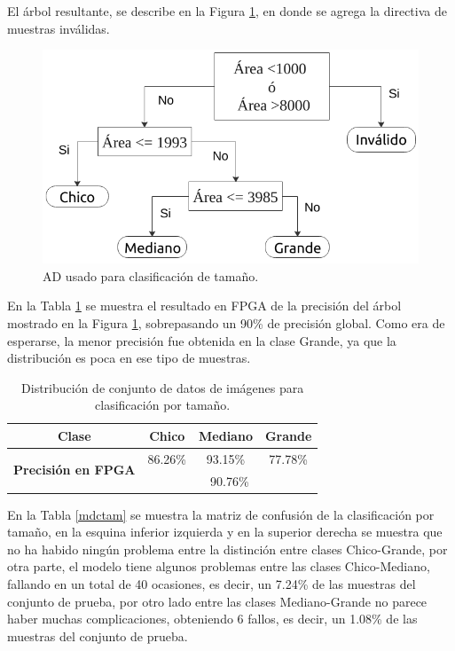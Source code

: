\documentclass[twoside,spanish,ESP,MSc]{plantillaLabUPV}
\theoremstyle{definition}
\begin{document}
El árbol resultante, se describe en la Figura \ref{adareas}, en donde se agrega la directiva de muestras inválidas.

\begin{figure} 
	\centering
	\includegraphics[width=0.8\linewidth]{edrawimas/arboldeareas}
	\caption{AD usado para clasificación de tamaño.}
	\label{adareas}
\end{figure}

En la Tabla \ref{acctam} se muestra el resultado en FPGA de la precisión del árbol mostrado en la Figura \ref{adareas}, sobrepasando un 90\% de precisión global. Como era de esperarse, la menor precisión fue obtenida en la clase Grande, ya que la distribución es poca en ese tipo de muestras. 

\begin{table}[!tbh]
	\caption{Distribución de conjunto de datos de imágenes para clasificación por tamaño.}
	\label{acctam}
	\centering
	\begin{tabular}{|c|c|c|c|}
		\hline
		\textbf{Clase}                              & \textbf{Chico} & \textbf{Mediano} & \textbf{Grande} \\ \hline
		\multirow{2}{*}{\textbf{Precisión en FPGA}} & 86.26\%        & 93.15\%          & 77.78\%         \\ \cline{2-4} 
		& \multicolumn{3}{c|}{90.76\%}                        \\ \hline
	\end{tabular}
\end{table}

En la Tabla \ref{mdctam} se muestra la matriz de confusión de la clasificación por tamaño, en la esquina inferior izquierda y en la superior derecha se muestra que no ha habido ningún problema entre la distinción entre clases Chico-Grande, por otra parte, el modelo tiene algunos problemas entre las clases Chico-Mediano, fallando en un total de 40 ocasiones, es decir, un 7.24\% de las muestras del conjunto de prueba, por otro lado entre las clases Mediano-Grande no parece haber muchas complicaciones, obteniendo 6 fallos, es decir, un 1.08\% de las muestras del conjunto de prueba. 
\end{document}
